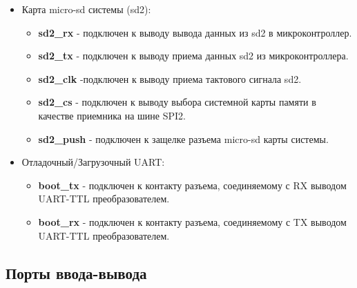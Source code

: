 \documentclass[a4paper, 12pt]{article}
\begin{document}
\begin{itemize}
	\item Карта micro-sd системы (sd2):
	\begin{itemize}
		\item \textbf{sd2\_rx} - подключен к выводу вывода данных из sd2 в микроконтроллер.
		\item \textbf{sd2\_tx} - подключен к выводу приема данных sd2 из микроконтроллера.
		\item \textbf{sd2\_clk} -подключен к выводу приема тактового сигнала sd2.
		\item \textbf{sd2\_cs} - подключен к выводу выбора системной карты памяти в качестве приемника на шине SPI2.
		\item \textbf{sd2\_push} - подключен к защелке разъема micro-sd карты системы.
	\end{itemize}
	
	\item Отладочный/Загрузочный UART:
	\begin{itemize}
		\item \textbf{boot\_tx} - подключен к контакту разъема, соединяемому с RX выводом UART-TTL преобразователем.
		\item \textbf{boot\_rx} - подключен к контакту разъема, соединяемому с TX выводом UART-TTL преобразователем.
	\end{itemize}
\end{itemize}

\subsection{Порты ввода-вывода}
\end{document}
